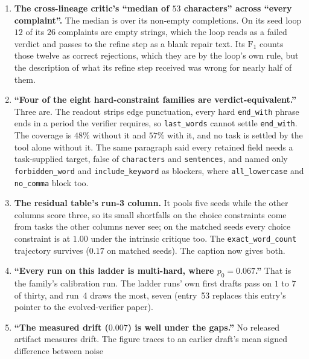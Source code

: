 \documentclass[11pt]{article}
\begin{document}
\begin{enumerate}
    abstract beside replicated effects. Over five replicates the same step is $-0.0080$
    ($t = 0.59$), and on the second worker at one refine round it is $+0.0327$ ($t = 4.94$). The
    value of naming the constraint depends on the worker; ``adds nothing'' survives for this worker
    only.
  \item \textbf{The cross-lineage critic's ``median of $53$ characters'' across ``every complaint''.}
    The median is over its non-empty completions. On its seed loop $12$ of its $26$ complaints are
    empty strings, which the loop reads as a failed verdict and passes to the refine step as a blank
    repair text. Its $\mathrm{F}_1$ counts those twelve as correct rejections, which they are by the
    loop's own rule, but the description of what its refine step received was wrong for nearly half
    of them.
  \item \textbf{``Four of the eight hard-constraint families are verdict-equivalent.''} Three are.
    The readout strips edge punctuation, every hard \texttt{end\_with} phrase ends in a period the
    verifier requires, so \texttt{last\_words} cannot settle \texttt{end\_with}. The coverage is
    $48\%$ without it and $57\%$ with it, and no task is settled by the tool alone without it. The
    same paragraph said every retained field needs a task-supplied target, false of
    \texttt{characters} and \texttt{sentences}, and named only \texttt{forbidden\_word} and
    \texttt{include\_keyword} as blockers, where \texttt{all\_lowercase} and \texttt{no\_comma}
    block too.
  \item \textbf{The residual table's run-3 column.} It pools five seeds while the other columns
    score three, so its small shortfalls on the choice constraints come from tasks the other
    columns never see; on the matched seeds every choice constraint is at $1.00$ under the
    intrinsic critique too. The \texttt{exact\_word\_count} trajectory survives ($0.17$ on matched
    seeds). The caption now gives both.
  \item \textbf{``Every run on this ladder is multi-hard, where $p_0 = 0.067$.''} That is the
    family's calibration run. The ladder runs' own first drafts pass on $1$ to $7$ of thirty, and
    run~4 draws the most, seven (entry~53 replaces this entry's pointer to the evolved-verifier
    paper).
  \item \textbf{``The measured drift ($0.007$) is well under the gaps.''} No released artifact
    measures drift. The figure traces to an earlier draft's mean signed difference between noise

\end{enumerate}
\end{document}
